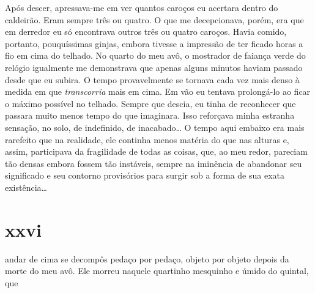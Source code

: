 

Após descer, apressava-me em ver quantos caroços eu acertara dentro do
caldeirão. Eram sempre três ou quatro. O que me decepcionava, porém, era que
em derredor eu só encontrava outros três ou quatro caroços. Havia comido,
portanto, pouquíssimas ginjas, embora tivesse a impressão de ter ficado horas
a fio em cima do telhado. No quarto do meu avô, o mostrador de faiança verde
do relógio igualmente me demonstrava que apenas alguns minutos haviam passado
desde que eu subira. O tempo provavelmente se tornava cada vez mais denso à
medida em que \textit{transcorria} mais em cima. Em vão eu tentava
prolongá-lo ao ficar o máximo possível no telhado. Sempre que descia, eu
tinha de reconhecer que passara muito menos tempo do que imaginara. Isso
reforçava minha estranha sensação, no solo, de indefinido, de inacabado\ldots
{} O tempo aqui embaixo era mais rarefeito que na realidade, ele continha
menos matéria do que nas alturas e, assim, participava da fragilidade de
todas as coisas, que, ao meu redor, pareciam tão densas embora fossem tão
instáveis, sempre na iminência de abandonar seu significado e seu contorno
provisórios para surgir sob a forma de sua exata existência\ldots{}

\section{xxvi} 

 andar de cima se decompôs pedaço por pedaço, objeto por
 objeto depois da morte do meu avô. Ele morreu naquele quartinho mesquinho e
 úmido do quintal, que 


